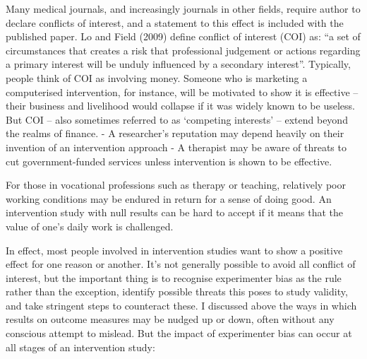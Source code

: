 \documentclass[]{book}
\begin{document}
Many medical journals, and increasingly journals in other fields, require author to declare conflicts of interest, and a statement to this effect is included with the published paper. Lo and Field (2009) define conflict of interest (COI) as:
``a set of circumstances that creates a risk that professional judgement or actions regarding a primary interest will be unduly influenced by a secondary interest''.
Typically, people think of COI as involving money. Someone who is marketing a computerised intervention, for instance, will be motivated to show it is effective -- their business and livelihood would collapse if it was widely known to be useless. But COI -- also sometimes referred to as `competing interests' -- extend beyond the realms of finance.
- A researcher's reputation may depend heavily on their invention of an intervention approach
- A therapist may be aware of threats to cut government-funded services unless intervention is shown to be effective.

For those in vocational professions such as therapy or teaching, relatively poor working conditions may be endured in return for a sense of doing good. An intervention study with null results can be hard to accept if it means that the value of one's daily work is challenged.

In effect, most people involved in intervention studies want to show a positive effect for one reason or another. It's not generally possible to avoid all conflict of interest, but the important thing is to recognise experimenter bias as the rule rather than the exception, identify possible threats this poses to study validity, and take stringent steps to counteract these. I discussed above the ways in which results on outcome measures may be nudged up or down, often without any conscious attempt to mislead. But the impact of experimenter bias can occur at all stages of an intervention study:
\end{document}
